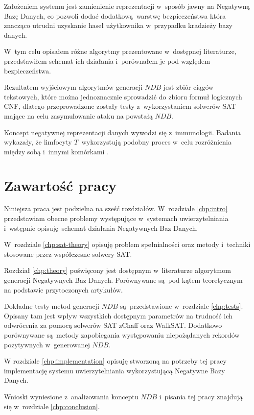  
Założeniem systemu jest zamienienie reprezentacji w~sposób jawny na Negatywną Bazę Danych, co pozwoli dodać 
dodatkową warstwę bezpieczeństwa która znacząco utrudni uzyskanie haseł użytkownika w~przypadku kradzieży bazy danych.

W~tym celu opisałem różne algorytmy prezentowane w~dostępnej literaturze, przedstawiłem schemat ich działania i~porównałem
je pod względem bezpieczeństwa. 

Rezultatem wyjściowym algorytmów generacji $NDB$ jest zbiór ciągów tekstowych, które można jednoznacznie sprowadzić 
do zbioru formuł logicznych CNF, dlatego przeprowadzone zostały testy z~wykorzystaniem solwerów SAT mające na celu 
zasymulowanie ataku na powstałą $NDB$.

Koncept negatywnej reprezentacji danych wywodzi się z~immunologii. Badania wykazały, że limfocyty $T$~wykorzystują
podobny proces w~celu rozróżnienia między sobą i~innymi komórkami \cite{T-cells}.

\section{Zawartość pracy}
Niniejsza praca jest podzielna na sześć rozdziałów. W~rozdziale \ref{chp:intro} przedstawiam obecne problemy występujące w~systemach uwierzytelniania i~wstępnie opisuję schemat działania Negatywnych Baz Danych.

W~rozdziale \ref{chp:sat-theory} opisuję problem spełnialności oraz metody i~techniki stosowane przez współczesne solwery SAT.

Rozdział \ref{chp:theory} poświęcony jest dostępnym w~literaturze algorytmom generacji Negatywnych Baz Danych. Porównywane są pod kątem teoretycznym na podstawie przytoczonych artykułów.

Dokładne testy metod generacji $NDB$ są przedstawione w~rozdziale \ref{chp:tests}. Opisany tam jest wpływ wszystkich dostępnym parametrów na trudność ich odwrócenia za pomocą solwerów SAT zChaff oraz WalkSAT.
Dodatkowo porównywane są metody zapobiegania występowaniu niepożądanych rekordów pozytywnych w~generowanej $NDB$.

W rozdziale \ref{chp:implementation} opisuję stworzoną na potrzeby tej pracy implementację systemu uwierzytelniania wykorzystującą Negatywne Bazy Danych.

Wnioski wyniesione z~analizowania konceptu $NDB$ i~pisania tej pracy znajdują się w~rozdziale \ref{chp:conclusion}.















